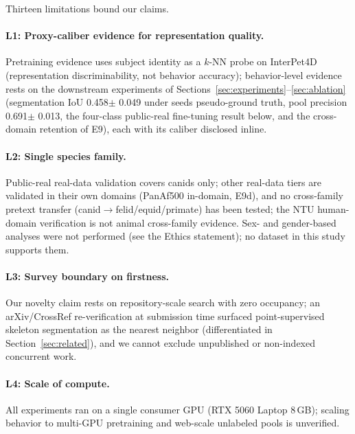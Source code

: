 Thirteen limitations bound our claims.

\paragraph{L1: Proxy-caliber evidence for representation quality.}
Pretraining evidence uses subject identity as a $k$-NN probe on InterPet4D (representation discriminability, not behavior accuracy); behavior-level evidence rests on the downstream experiments of Sections~\ref{sec:experiments}--\ref{sec:ablation} (segmentation IoU 0.458$\pm$ 0.049 under seeds pseudo-ground truth, pool precision 0.691$\pm$ 0.013, the four-class public-real fine-tuning result below, and the cross-domain retention of E9), each with its caliber disclosed inline.

\paragraph{L2: Single species family.}
Public-real real-data validation covers canids only; other real-data tiers are validated in their own domains (PanAf500 in-domain, E9d), and no cross-family pretext transfer (canid$\to$felid/equid/primate) has been tested; the NTU human-domain verification is not animal cross-family evidence. Sex- and gender-based analyses were not performed (see the Ethics statement); no dataset in this study supports them.

\paragraph{L3: Survey boundary on firstness.}
Our novelty claim rests on repository-scale search with zero occupancy; an arXiv/CrossRef re-verification at submission time surfaced point-supervised skeleton segmentation as the nearest neighbor (differentiated in Section~\ref{sec:related}), and we cannot exclude unpublished or non-indexed concurrent work.

\paragraph{L4: Scale of compute.}
All experiments ran on a single consumer GPU (RTX 5060 Laptop 8\,GB); scaling behavior to multi-GPU pretraining and web-scale unlabeled pools is unverified.


